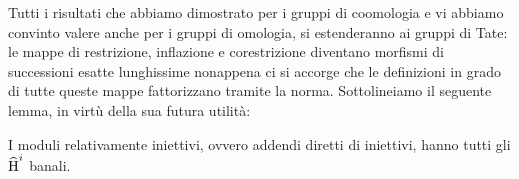 Tutti i risultati che abbiamo dimostrato per i gruppi di coomologia e vi abbiamo convinto valere anche per i gruppi di omologia, si estenderanno ai gruppi di Tate: le mappe di restrizione, inflazione e corestrizione diventano morfismi di successioni esatte lunghissime nonappena ci si accorge che le definizioni in grado di tutte queste mappe fattorizzano tramite la norma. Sottolineiamo il seguente lemma, in virtù della sua futura utilità:

\begin{lemma}
	I moduli relativamente iniettivi, ovvero addendi diretti di iniettivi, hanno tutti gli $ \operatorname{\widehat{H}}^i $ banali.
\end{lemma}



